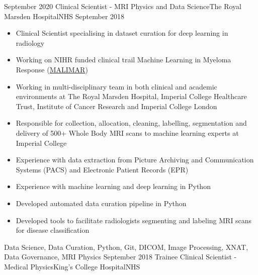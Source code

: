 %
%
%
\begin{experiences}
  \experience
    {September 2020}   {Clinical Scientist - MRI Physics and Data Science}{The Royal Marsden Hospital}{NHS}
    {September 2018} {
                      \begin{itemize}
                        \item Clinical Scientist specialising in dataset curation for deep learning in radiology
                        \item Working on NIHR funded clinical trail Machine Learning in Myeloma Response
                              ({\color{linkcolor}\href{https://fundingawards.nihr.ac.uk/award/16/68/34}{MALIMAR}})
                        \item Working in multi-disciplinary team in both clinical and academic environments at The Royal Marsden Hospital,
                        Imperial College Healthcare Trust, Institute of Cancer Research and Imperial College London
                        \item Responsible for collection, allocation, cleaning, labelling, segmentation and delivery of 500+
                        Whole Body MRI scans to machine learning experts at Imperial College
                        \item Experience with data extraction from Picture Archiving and Communication Systems (PACS) and
                        Electronic Patient Records (EPR)
                        \item Experience with machine learning and deep learning in Python
                        \item Developed automated data curation pipeline in Python
                        \item Developed tools to facilitate radiologists segmenting and labeling MRI scans for disease classification
                      \end{itemize}
                    }
                    {Data Science, Data Curation, Python, Git, DICOM, Image Processing, XNAT, Data Governance, MRI Physics}
  \emptySeparator
  \experience
    {September 2018} {Trainee Clinical Scientist - Medical Physics}{King's College Hospital}{NHS}

\end{experiences}
